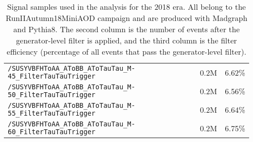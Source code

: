 \begin{table}[ht]
\begin{center}
{\begin{tabular}{|l|c|c|}
    \texttt{/SUSYVBFHToAA\_AToBB\_AToTauTau\_M-45\_FilterTauTauTrigger} & 0.2M & 6.62\%\\
    \texttt{/SUSYVBFHToAA\_AToBB\_AToTauTau\_M-50\_FilterTauTauTrigger} & 0.2M & 6.56\%\\
    \texttt{/SUSYVBFHToAA\_AToBB\_AToTauTau\_M-55\_FilterTauTauTrigger} & 0.2M & 6.64\%\\
    \texttt{/SUSYVBFHToAA\_AToBB\_AToTauTau\_M-60\_FilterTauTauTrigger} & 0.2M & 6.75\%\\
    \hline
    \end{tabular}
    }
    \end{center} 
    \caption{Signal samples used in the analysis for the 2018 era. All belong to the RunIIAutumn18MiniAOD campaign and are produced with Madgraph and Pythia8. The second column is the number of events after the generator-level filter is applied, and the third column is the filter efficiency (percentage of all events that pass the generator-level filter).}
    \label{tab:2018signal}
    \end{table}
    